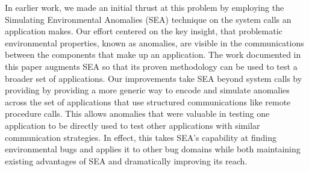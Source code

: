 



In earlier work, we made an initial thrust at this problem by employing the
Simulating Environmental Anomalies (SEA) technique on the system calls an
application makes. Our effort centered on the key insight, that problematic
environmental properties, known as anomalies, are visible in the
communications between the components that make up an application.  The
work documented in this paper augments SEA so that its proven methodology
can be used to test a broader set of applications.  Our improvements take
SEA beyond system calls by providing by providing a more generic way to
encode and simulate anomalies across the set of applications that use
structured communications like remote procedure calls.
This allows anomalies that were
valuable in testing one application to be directly used to test other
applications with similar communication strategies.  In effect, this takes
SEA's capability at finding environmental bugs and applies it to other bug
domains while both maintaining existing advantages of SEA and
dramatically improving its reach.




